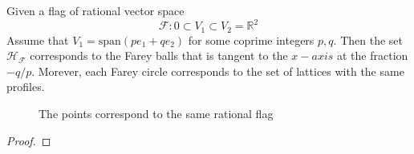 \begin{prop}
   Given a flag of rational vector space 
   \[\mathcal{F}: 0 \subset V_1 \subset V_2 =\mathbb{R}^2\]
   Assume that $V_1 = \text{span}(pe_1+qe_2)$ for some coprime integers $p,q$. Then 
   the set $\mathcal{H}_\mathcal{F}$ corresponds to the Farey balls that is tangent to the $x-axis$ at the fraction $-q/p$.
   Morever, each Farey circle corresponds to the set of lattices with the same profiles. 
\end{prop}
\begin{figure}[h]
  \centering
  \caption{The points correspond to the same rational flag}
  \label{P-coordinate}
\end{figure}
\begin{proof}

\end{proof}

